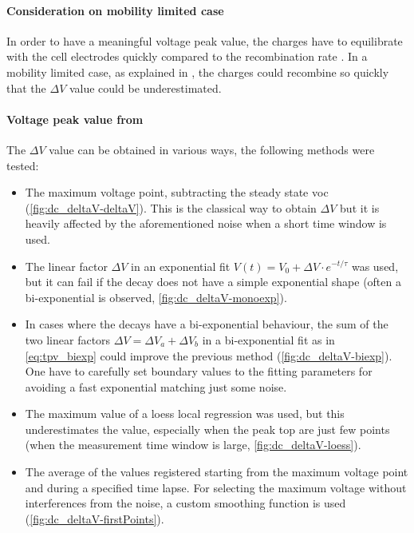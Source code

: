 	\paragraph{Consideration on mobility limited case}
	In order to have a meaningful voltage peak value, the charges have to equilibrate with the cell electrodes quickly compared to the recombination rate \cite{Credgington2014}.
	In a mobility limited case, as explained in , the charges could recombine so quickly that the $\Delta V$ value could be underestimated.

	\paragraph{Voltage peak value from }\label{tpv_deltaV}
	The $\Delta V$ value can be obtained in various ways, the following methods were tested:
	\begin{itemize}
		\item The maximum voltage point, subtracting the steady state \gls{voc} (\cref{fig:dc_deltaV-deltaV}). This is the classical way to obtain $\Delta V$ but it is heavily affected by the aforementioned noise when a short time window is used.
		\item The linear factor $\Delta V$ in an exponential fit $V (t) = V_0 + \Delta V \cdot e^{-t/\tau}$ was used, but it can fail if the decay does not have a simple exponential shape (often a bi\hyp{}exponential is observed, \cref{fig:dc_deltaV-monoexp}).
		\item In cases where the  decays have a bi\hyp{}exponential behaviour, the sum of the two linear factors $\Delta V = \Delta V_a + \Delta V_b$ in a bi\hyp{}exponential fit as in \cref{eq:tpv_biexp} could improve the previous method (\cref{fig:dc_deltaV-biexp}). One have to carefully set boundary values to the fitting parameters for avoiding a fast exponential matching just some noise.
		\item The maximum value of a \gls{loess} local regression was used, but this underestimates the value, especially when the peak top are just few points (when the measurement time window is large, \cref{fig:dc_deltaV-loess}).
		\item The average of the values registered starting from the maximum voltage point and during a specified time lapse. For selecting the maximum voltage without interferences from the noise, a custom smoothing function is used (\cref{fig:dc_deltaV-firstPoints}).
	\end{itemize}
